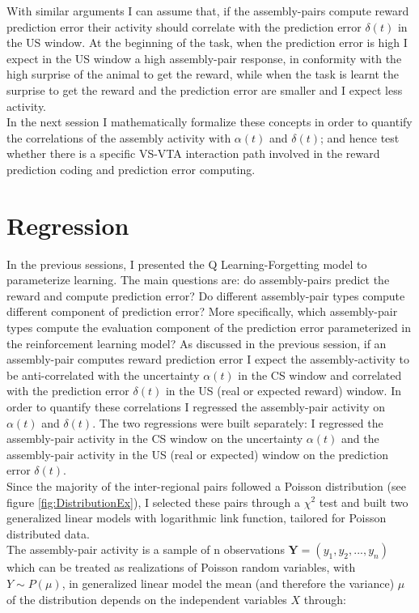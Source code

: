 With similar arguments I can assume that, if the assembly-pairs compute reward prediction error their activity should correlate with the prediction error $\delta(t)$ in the US window. At the beginning of the task, when the prediction error is high I expect in the US window a high assembly-pair response, in conformity with the high surprise of the animal to get the reward, while when the task is learnt the surprise to get the reward and the prediction error are smaller and I expect less activity.\\In the next session I mathematically formalize these concepts in order to quantify the correlations of the assembly activity with $\alpha(t)$ and $\delta(t)$; and hence test whether there is a specific VS-VTA interaction path involved in the reward prediction coding and prediction error computing. 
\section{Regression}
\label{sec:Regression}
In the previous sessions, I presented the Q Learning-Forgetting model to parameterize learning. The main questions are: do assembly-pairs predict the reward and compute prediction error? Do different assembly-pair types compute different component of prediction error? More specifically, which assembly-pair types compute the evaluation component of the prediction error parameterized in the reinforcement learning model? As discussed in the previous session, if an assembly-pair computes reward prediction error I expect the assembly-activity to be anti-correlated with the uncertainty $\alpha(t)$ in the CS window and correlated with the prediction error $\delta(t)$ in the US (real or expected reward) window. In order to quantify these correlations I regressed the assembly-pair activity on $\alpha (t)$ and $\delta (t)$. The two regressions were built separately: I regressed the assembly-pair activity in the CS window on the uncertainty $\alpha(t)$ and the assembly-pair activity in the US (real or expected) window on the prediction error $\delta(t)$.\\Since the majority of the inter-regional pairs followed a Poisson distribution (see figure \ref{fig:DistributionEx}), I selected these pairs through a $\chi^2$ test and built two generalized linear models with logarithmic link function, tailored for Poisson distributed data.\\The assembly-pair activity is a sample of n observations $\mathbf{Y}=(y_1, y_2,..., y_n)$ which can be treated as realizations of Poisson random variables, with $Y\sim P(\mu)$, in generalized linear model the mean (and therefore the variance) $\mu$ of the distribution depends on the independent variables $X$ through:
